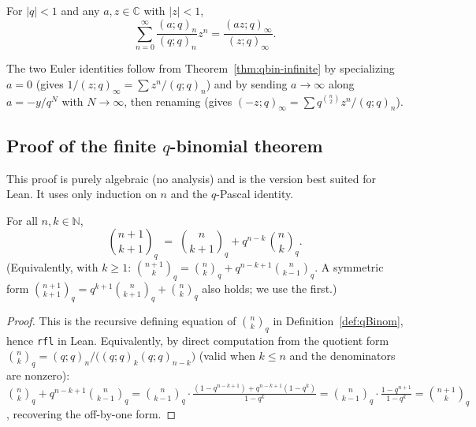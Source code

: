 \begin{theorem}\label{thm:qbin-infinite}\leanok{}
For $|q| < 1$ and any $a, z \in \mathbb{C}$ with $|z| < 1$,
\[
\sum_{n=0}^\infty \frac{(a; q)_n}{(q; q)_n} z^n = \frac{(a z; q)_\infty}{(z; q)_\infty}.
\]
\end{theorem}

The two Euler identities follow from Theorem~\ref{thm:qbin-infinite} by specializing $a = 0$ (gives $1/(z;q)_\infty = \sum z^n / (q;q)_n$) and by sending $a \to \infty$ along $a = -y/q^N$ with $N \to \infty$, then renaming (gives $(-z;q)_\infty = \sum q^{\binom{n}{2}} z^n / (q;q)_n$).

\subsection{Proof of the finite $q$-binomial theorem}

This proof is purely algebraic (no analysis) and is the version best suited for Lean. It uses only induction on $n$ and the $q$-Pascal identity.

\begin{lemma}[$q$-Pascal]\label{lem:qpascal}\leanok{}
For all $n, k \in \mathbb{N}$,
\[
  \binom{n+1}{k+1}_q \;=\; \binom{n}{k+1}_q + q^{n - k}\,\binom{n}{k}_q.
\]
(Equivalently, with $k \geq 1$:
$\binom{n+1}{k}_q = \binom{n}{k}_q + q^{n - k + 1}\binom{n}{k-1}_q$.
A symmetric form $\binom{n+1}{k+1}_q = q^{k+1}\binom{n}{k+1}_q + \binom{n}{k}_q$
also holds; we use the first.)
\end{lemma}

\begin{proof}\leanok
This is the recursive defining equation of $\binom{n}{k}_q$ in
Definition~\ref{def:qBinom}, hence \texttt{rfl} in Lean. Equivalently, by
direct computation from the quotient form
$\binom{n}{k}_q = (q;q)_n / \bigl((q;q)_k(q;q)_{n-k}\bigr)$
(valid when $k \leq n$ and the denominators are nonzero):
$\binom{n}{k}_q + q^{n-k+1}\binom{n}{k-1}_q
  = \binom{n}{k-1}_q \cdot \tfrac{(1 - q^{n-k+1}) + q^{n-k+1}(1 - q^k)}{1 - q^k}
  = \binom{n}{k-1}_q \cdot \tfrac{1 - q^{n+1}}{1 - q^k}
  = \binom{n+1}{k}_q$,
recovering the off-by-one form.
\end{proof}

